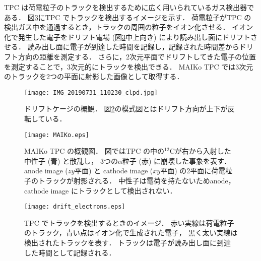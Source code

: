 \documentclass[../master]{subfiles}
\begin{document}
TPC は荷電粒子のトラックを検出するために広く用いられているガス検出器である．
図\ref{fig::drift_electrons}にTPC でトラックを検出するイメージを示す．
荷電粒子がTPC の検出ガス中を通過するとき，トラックの周囲の粒子をイオン化させる．
イオン化で発生した電子をドリフト電場 (図\ref{fig::drift_electrons}中上向き) により読み出し面にドリフトさせる．
読み出し面に電子が到達した時間を記録し，記録された時間差からドリフト方向の距離を測定する．
さらに，2次元平面でドリフトしてきた電子の位置を測定することで，3次元的にトラックを検出できる．
MAIKo TPC では3次元のトラックを2つの平面に射影した画像として取得する．
%
\begin{figure}
  \centering
  \texttt{[image: IMG\_20190731\_110230\_clpd.jpg]}
  \caption[ドリフトケージの概観．]
          {ドリフトケージの概観．
          図\ref{fig::MAIKo_view}の模式図とはドリフト方向が上下が反転している．}
  \label{pic::MAIKo_cage}
\end{figure}
\begin{figure}
  \centering
  \texttt{[image: MAIKo.eps]}
  \caption[MAIKo TPC の概観図．]{MAIKo TPC の概観図．
    図ではTPC の中の${}^{12}\mathrm{C}$が右から入射した中性子 (青) と散乱し，
    3つの$\alpha$粒子 (赤) に崩壊した事象を表す．
    anode image ($zy$平面) と cathode image ($xy$平面) の2平面に荷電粒子のトラックが射影される．
    中性子は電荷を持たないためanode，cathode image にトラックとして検出されない．
  }
  \label{fig::MAIKo_view}
\end{figure}
\begin{figure}
  \centering
  \texttt{[image: drift\_electrons.eps]}
  \caption{TPC でトラックを検出するときのイメージ．
    赤い実線は荷電粒子のトラック，青い点はイオン化で生成された電子，
    黒く太い実線は検出されたトラックを表す．
    トラックは電子が読み出し面に到達した時間として記録される．}
  \label{fig::drift_electrons}
\end{figure}
\end{document}
